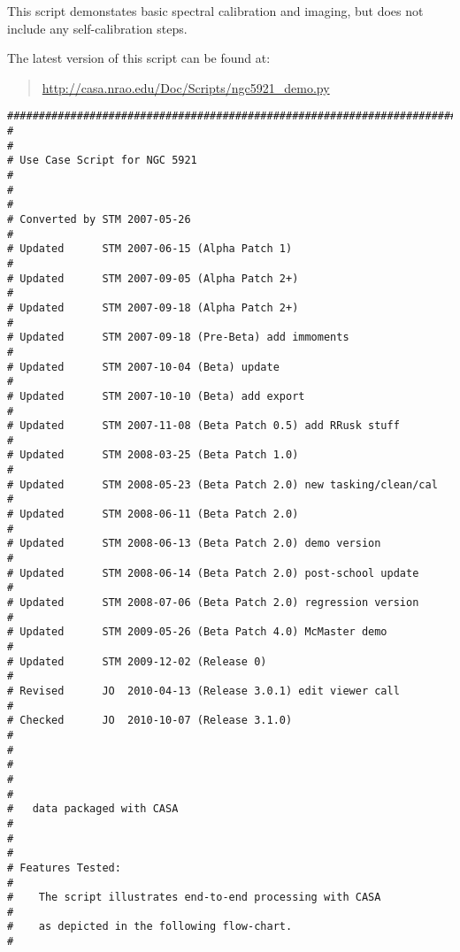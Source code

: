 This script demonstates basic spectral calibration and imaging, but
does not include any self-calibration steps.

The latest version of this script can be found at:
\begin{quote}
   \url{http://casa.nrao.edu/Doc/Scripts/ngc5921_demo.py}
\end{quote}

\small
\begin{verbatim}
##########################################################################
#                                                                        #
# Use Case Script for NGC 5921                                           #
#                                                                        #
# Converted by STM 2007-05-26                                            #
# Updated      STM 2007-06-15 (Alpha Patch 1)                            #
# Updated      STM 2007-09-05 (Alpha Patch 2+)                           #
# Updated      STM 2007-09-18 (Alpha Patch 2+)                           #
# Updated      STM 2007-09-18 (Pre-Beta) add immoments                   #
# Updated      STM 2007-10-04 (Beta) update                              #
# Updated      STM 2007-10-10 (Beta) add export                          #
# Updated      STM 2007-11-08 (Beta Patch 0.5) add RRusk stuff           #
# Updated      STM 2008-03-25 (Beta Patch 1.0)                           #
# Updated      STM 2008-05-23 (Beta Patch 2.0) new tasking/clean/cal     #
# Updated      STM 2008-06-11 (Beta Patch 2.0)                           #
# Updated      STM 2008-06-13 (Beta Patch 2.0) demo version              #
# Updated      STM 2008-06-14 (Beta Patch 2.0) post-school update        #
# Updated      STM 2008-07-06 (Beta Patch 2.0) regression version        #
# Updated      STM 2009-05-26 (Beta Patch 4.0) McMaster demo             #
# Updated      STM 2009-12-02 (Release 0)                                #
# Revised      JO  2010-04-13 (Release 3.0.1) edit viewer call           #
# Checked      JO  2010-10-07 (Release 3.1.0)                            #
#                                                                        #
#                                                                        #
#   data packaged with CASA                                              #
#                                                                        #
# Features Tested:                                                       #
#    The script illustrates end-to-end processing with CASA              #
#    as depicted in the following flow-chart.                            #

\end{verbatim}
